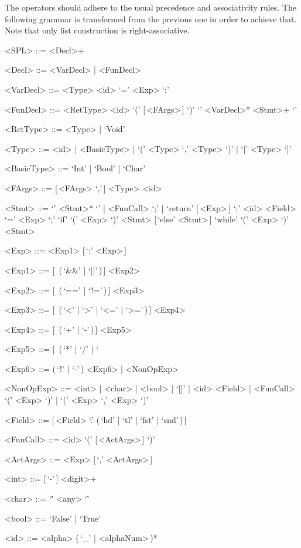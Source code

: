 \documentclass{article}
\begin{document}
The operators should adhere to the usual precedence and associativity rules.
The following grammar is transformed from the previous one in order to achieve that.
Note that only list construction is right-associative.
\setlength{\grammarindent}{7.1em}
\begin{grammar}
    <SPL> ::= <Decl>+

    <Decl> ::= <VarDecl> | <FunDecl>

    <VarDecl> ::= <Type> <id> `=' <Exp> `;'

    <FunDecl> ::= <RetType> <id> `(' [\,<FArgs>\,] `)' `{' <VarDecl>* <Stmt>+ `}'

    <RetType> ::= <Type> | `Void'

    <Type> ::= <id> | <BasicType> | `(' <Type> `,' <Type> `)' | `[' <Type> `]'

    <BasicType> ::= `Int' | `Bool' | `Char'

    <FArgs> ::= [\,<FArgs> `,'\,] <Type> <id>

    <Stmt> ::= `{' <Stmt>* `}' | <FunCall> `;' | `return' [\,<Exp>\,] `;'
    \alt <id> <Field> `=' <Exp> `;'
    \alt `if' `(' <Exp> `)' <Stmt> [\,`else' <Stmt>\,]
    \alt `while' `(' <Exp> `)' <Stmt>

    <Exp> ::= <Exp1> [\,`:' <Exp>\,]

    <Exp1> ::= [\,<Exp1> (\,`&&' | `||'\,)\,] <Exp2>

    <Exp2> ::= [\,<Exp2> (\,`==' | `!='\,)\,] <Exp3>

    <Exp3> ::= [\,<Exp3> (\,`<' | `>' | `<=' | `>='\,)\,] <Exp4>

    <Exp4> ::= [\,<Exp4> (\,`+' | `-'\,)\,] <Exp5>

    <Exp5> ::= [\,<Exp5> (\,`*' | `/' | `%

    <Exp6> ::= (\,`!' | `-'\,) <Exp6> | <NonOpExp>

    <NonOpExp> ::= <int> | <char> | <bool> | `[]' | <id> <Field> | <FunCall>
    \alt `(' <Exp> `)' | `(' <Exp> `,' <Exp> `)'

    <Field> ::= [\,<Field> `.' (\,`hd' | `tl' | `fst' | `snd'\,)\,]

    <FunCall> ::= <id> `(' [\,<ActArgs>\,] `)'

    <ActArgs> ::= <Exp> [\,`,' <ActArgs>\,]

    <int> ::= [\,`-'\,] <digit>+

    <char> ::= `\'' <any> `\''

    <bool> ::= `False' | `True'

    <id> ::= <alpha> (\,`_' | <alphaNum>\,)*
\end{grammar}
\end{document}

